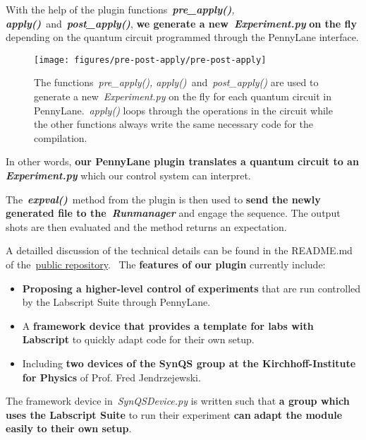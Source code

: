 \documentclass[%
 reprint,
 amsmath,amssymb,
 aps,
]{revtex4-1}
\providecommand{\tightlist}{\setlength{\itemsep}{0pt}\setlength{\parskip}{0pt}}%
\begin{document}
With the help of the plugin functions~\emph{\textbf{pre\_apply()},
\textbf{apply()}~}and~\emph{\textbf{post\_apply()}}, \textbf{we generate
a new~}\emph{\textbf{Experiment.py}} \textbf{on the fly} depending on
the quantum circuit programmed through the PennyLane interface.
\begin{figure}[h!]
\begin{center}
\texttt{[image: figures/pre-post-apply/pre-post-apply]}
\caption{{The functions~\emph{pre\_apply(), apply()~}and~\emph{post\_apply()} are
used to generate a new~\emph{Experiment.py} on the fly for each quantum
circuit in PennyLane.~\emph{apply()} loops through the operations in the
circuit while the other functions always write the same necessary code
for the compilation.
{\label{547624}}%
}}
\end{center}
\end{figure}

In other words, \textbf{our PennyLane plugin translates a quantum
circuit to an} \emph{\textbf{Experiment.py}} which our control system
can interpret.

The~\emph{\textbf{expval()}}~method from the plugin is then used to
\textbf{send the newly generated file to the~}\emph{\textbf{Runmanager}}
and engage the sequence. The output shots are then evaluated and the
method returns an expectation.

A detailled discussion of the technical details can be found in the
README.md of the~\href{https://github.com/synqs/pennylane_ls}{public
repository}. ~The \textbf{features of our plugin} currently include:

\begin{itemize}
\tightlist
\item
  \textbf{Proposing a higher-level control of experiments} that are run
  controlled by the Labscript Suite through PennyLane.
\item
  A \textbf{framework device that provides a template for labs with
  Labscript} to quickly adapt code for their own setup.
\item
  Including \textbf{two devices of the SynQS group at the
  Kirchhoff-Institute} \textbf{for Physics} of Prof. Fred Jendrzejewski.
\end{itemize}

The framework device in~\emph{SynQSDevice.py} is written such that
\textbf{a group which uses the Labscript Suite} to run their experiment
\textbf{can} \textbf{adapt the module easily to their own setup}.
\end{document}
